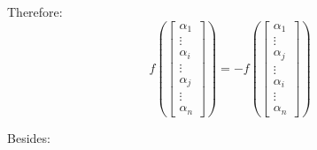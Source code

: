 \documentclass{article}
\begin{document}
Therefore:
\begin{equation}
f(
\begin{bmatrix}
    \alpha_1 \\
    \vdots \\
    \alpha_i \\
    \vdots \\
    \alpha_j \\
    \vdots \\
    \alpha_n
\end{bmatrix}) = 
-f(\begin{bmatrix}
    \alpha_1 \\
    \vdots \\
    \alpha_j \\
    \vdots \\
    \alpha_i \\
    \vdots \\
    \alpha_n
\end{bmatrix})
\end{equation}

Besides:
\end{document}
